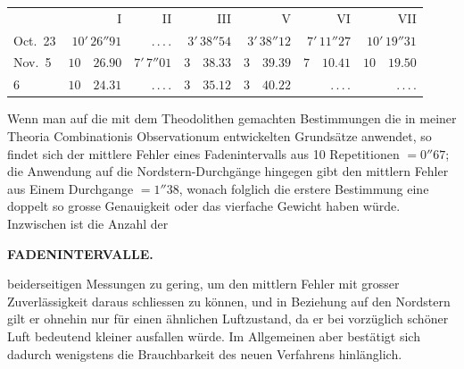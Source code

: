 \begin{center}
\begingroup\small\setlength{\tabcolsep}{4pt}
\begin{tabular}{l|r|r|r|r|r|r}
 & I & II & III & V & VI & VII \\
Oct.\ 23 & $10'\,26''91$ & .\,.\,.\,. & $3'\,38''54$ & $3'\,38''12$ & $7'\,11''27$ & $10'\,19''31$ \\
Nov.\ 5 & $10\quad26.90$ & $7'\,7''01$ & $3\quad38.33$ & $3\quad39.39$ & $7\quad10.41$ & $10\quad19.50$ \\
\phantom{Nov.\ }6 & $10\quad24.31$ & .\,.\,.\,. & $3\quad35.12$ & $3\quad40.22$ & .\,.\,.\,. & .\,.\,.\,. \\
\end{tabular}
\endgroup
\end{center}

Wenn man auf die mit dem Theodolithen gemachten Bestimmungen die in meiner Theoria
Combinationis Observationum entwickelten Grundsätze anwendet, so findet sich der mittlere Fehler
eines Fadenintervalls aus 10 Repetitionen $= 0''67$; die Anwendung auf die
Nordstern-Durchgänge hingegen gibt den mittlern Fehler aus Einem Durchgange $= 1''38$, wonach
folglich die erstere Bestimmung eine doppelt so grosse Genauigkeit oder das vierfache Gewicht haben
würde. Inzwischen ist die Anzahl der\par
\clearpage
\noindent{}%
%
\parbox[t]{\dimexpr\linewidth-24mm\relax}{\centering\footnotesize\bfseries FADENINTERVALLE.\par}%
\makebox[12mm][r]{}\par\nobreak\medskip
\noindent beiderseitigen Messungen zu gering, um den mittlern Fehler mit grosser Zuverlässigkeit daraus
schliessen zu können, und in Beziehung auf den Nordstern gilt er ohnehin nur für einen ähnlichen
Luftzustand, da er bei vorzüglich schöner Luft bedeutend kleiner ausfallen würde. Im Allgemeinen aber
bestätigt sich dadurch wenigstens die Brauchbarkeit des neuen Verfahrens hinlänglich.

